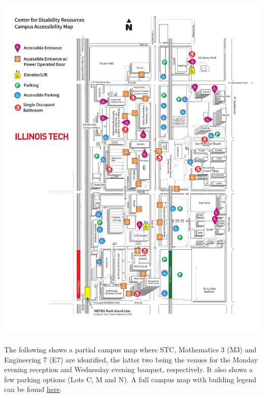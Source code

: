 \begin{center}
	\includegraphics[width = \textwidth] {Photos/mies-campus-accessibility-map-2022.pdf}
\end{center}


The following shows a partial campus map where STC, Mathematics 3 (M3) and Engineering 7 (E7) are identified, the latter two being the venues for the Monday evening reception and Wednesday evening banquet, respectively. It also shows a few parking options (Lots C, M and N).
A full campus map with building legend can be found 
\href{https://uwaterloo.ca/about/sites/default/files/uploads/documents/fp2102-2022-campusmap-padded-tearoff_lr-final-ua.pdf}{here}.

